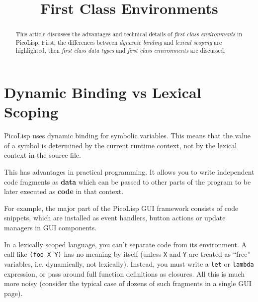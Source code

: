 \title{First Class Environments}

\maketitle





% 

\begin{abstract}
  This article discusses the advantages and technical details of
  \emph{first class environments} in PicoLisp. First, the differences
  between \emph{dynamic binding} and \emph{lexical scoping} are
  highlighted, then \emph{first class data types} and \emph{first
    class environments} are discussed. 
\end{abstract}


\section{Dynamic Binding vs Lexical Scoping}
\label{sec:firstclass-dynamic-binding}

PicoLisp uses dynamic binding for symbolic variables. This means that
the value of a symbol is determined by the current runtime context,
not by the lexical context in the source file.

This has advantages in practical programming. It allows you to write
independent code fragments as \textbf{data} which can be passed to
other parts of the program to be later executed as \textbf{code} in
that context.

For example, the major part of the PicoLisp GUI framework consists of
code snippets, which are installed as event handlers, button actions
or update managers in GUI components.

In a lexically scoped language, you can't separate code from its
environment. A call like \texttt{(foo X Y)} has no meaning by itself
(unless \texttt{X} and \texttt{Y} are treated as ``free'' variables,
i.e. dynamically, not lexically). Instead, you must write a
\texttt{let} or \texttt{lambda} expression, or pass around full
function definitions as closures. All this is much more noisy
(consider the typical case of dozens of such fragments in a single GUI
page).

